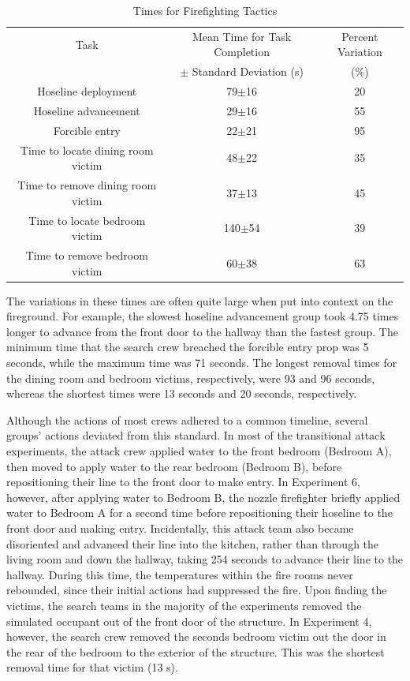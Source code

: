 \documentclass[12pt,oneside]{article}
\begin{document}
\begin{table}[!ht]
    \centering
    \caption{Times for Firefighting Tactics}
    \label{tab:ff_tasks}
    \begin{tabular}{ccc}
    \toprule[1.5pt]
 	Task&								Mean Time for Task Completion  	&Percent Variation\\
 		&								$\pm$ Standard Deviation (s)	&	(\%)		\\
 	\midrule 
  	Hoseline deployment					&	79$\pm$16					&	20\\
  	Hoseline advancement				&	29$\pm$16					&	55\\
  	Forcible entry						&	22$\pm$21					&	95\\
  	Time to locate dining room victim 	&	48$\pm$22					&	35\\
  	Time to remove dining room victim 	&	37$\pm$13					&	45\\
  	Time to locate bedroom victim 		&	140$\pm$54					&	39\\
  	Time to remove bedroom victim 		&	60$\pm$38					&	63\\  	
 	\bottomrule[1.25pt] 
    \end{tabular}
\end{table}

The variations in these times are often quite large when put into context on the fireground. For example, the slowest hoseline advancement group took 4.75 times longer to advance from the front door to the hallway than the fastest group. The minimum time that the search crew breached the forcible entry prop was 5 seconds, while the maximum time was 71 seconds. The longest removal times for the dining room and bedroom victims, respectively, were 93 and 96 seconds, whereas the shortest times were 13 seconds and 20 seconds, respectively. 

Although the actions of most crews adhered to a common timeline, several groups' actions deviated from this standard. In most of the transitional attack experiments, the attack crew applied water to the front bedroom (Bedroom A), then moved to apply water to the rear bedroom (Bedroom B), before repositioning their line to the front door to make entry. In Experiment 6, however, after applying water to Bedroom B, the nozzle firefighter briefly applied water to Bedroom A for a second time before repositioning their hoseline to the front door and making entry. Incidentally, this attack team also became disoriented and advanced their line into the kitchen, rather than through the living room and down the hallway, taking 254 seconds to advance their line to the hallway. During this time, the temperatures within the fire rooms never rebounded, since their initial actions had suppressed the fire. Upon finding the victims, the search teams in the majority of the experiments removed the simulated occupant out of the front door of the structure. In Experiment 4, however, the search crew removed the seconds bedroom victim out the door in the rear of the bedroom to the exterior of the structure. This was the shortest removal time for that victim (13 s). 
\end{document}
